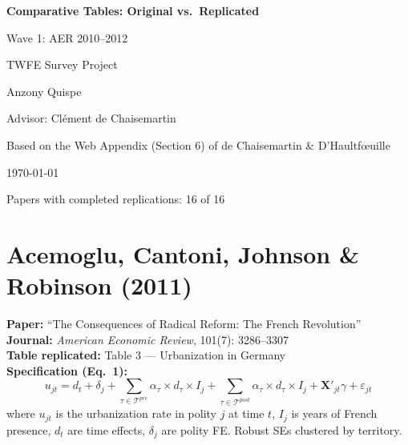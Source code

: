 \documentclass[11pt,a4paper]{article}
\begin{document}
\begin{titlepage}
\centering
\vspace*{3cm}
{\Huge\bfseries Comparative Tables: Original vs.\ Replicated\par}
\vspace{1cm}
{\LARGE Wave 1: AER 2010--2012\par}
\vspace{2cm}
{\Large TWFE Survey Project\par}
\vspace{0.5cm}
{\large Anzony Quispe\par}
{\large Advisor: Cl\'ement de Chaisemartin\par}
\vspace{1cm}
{\large Based on the Web Appendix (Section 6) of de Chaisemartin \& D'Haultf\oe uille\par}
\vspace{2cm}
{\large \today\par}
\vfill
{\small Papers with completed replications: 16 of 16\par}
\end{titlepage}

\tableofcontents
\newpage

\section{Acemoglu, Cantoni, Johnson \& Robinson (2011)}

\textbf{Paper:} ``The Consequences of Radical Reform: The French Revolution''\\
\textbf{Journal:} \textit{American Economic Review}, 101(7): 3286--3307\\
\textbf{Table replicated:} Table 3 --- Urbanization in Germany\\
\textbf{Specification (Eq.\ 1):}
\[
u_{jt} = d_t + \delta_j + \sum_{\tau \in \mathcal{T}^{pre}} \alpha_\tau \times d_\tau \times I_j
+ \sum_{\tau \in \mathcal{T}^{post}} \alpha_\tau \times d_\tau \times I_j
+ \mathbf{X}'_{jt}\gamma + \varepsilon_{jt}
\]
where $u_{jt}$ is the urbanization rate in polity $j$ at time $t$, $I_j$ is years of French presence, $d_t$ are time effects, $\delta_j$ are polity FE. Robust SEs clustered by territory.

\vspace{0.3cm}
\noindent{}
\end{document}
